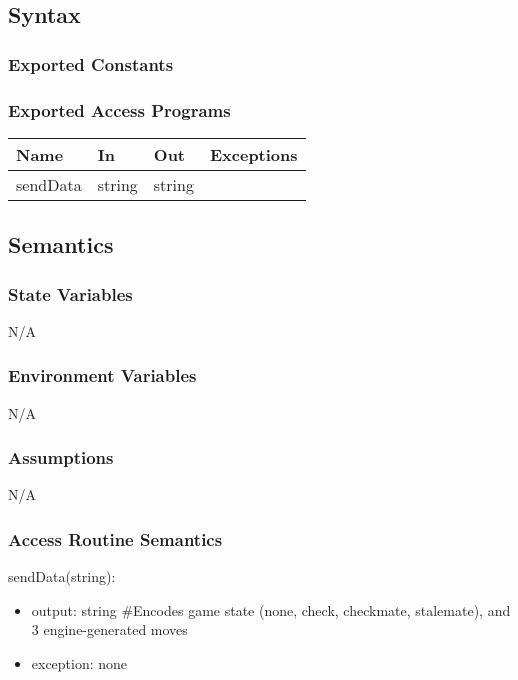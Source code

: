 \documentclass[12pt, titlepage]{article}
\begin{document}
    \subsection{Syntax}
    \subsubsection{Exported Constants}

    \subsubsection{Exported Access Programs}
        \begin{center}
        \begin{tabular}{p{4.5cm} p{4cm} p{3cm} p{2.5cm}}
        \hline
        \textbf{Name} & \textbf{In} & \textbf{Out} & \textbf{Exceptions} \\
        \hline
        sendData & string & string & \\
        \hline
        \end{tabular}
        \end{center}

    \subsection{Semantics}
    \subsubsection{State Variables}
    N/A

    \subsubsection{Environment Variables}
    N/A

    \subsubsection{Assumptions}
    N/A

    \subsubsection{Access Routine Semantics}
        \noindent sendData(string):
        \begin{itemize}
            \item output: string \#Encodes game state (none, check, 
                checkmate, stalemate), and 3 engine-generated moves
            \item exception: none
        \end{itemize}
\end{document}

